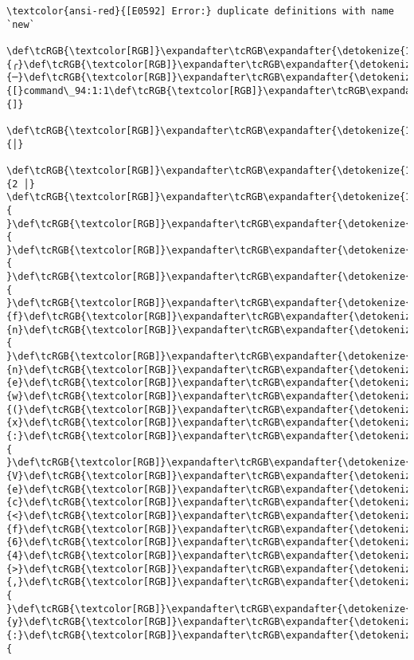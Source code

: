 \documentclass[11pt]{article}
\begin{document}
    \begin{Verbatim}[commandchars=\\\{\}, frame=single, framerule=2mm, rulecolor=\color{outerrorbackground}]
\textcolor{ansi-red}{[E0592] Error:} duplicate definitions with name `new`
   \def\tcRGB{\textcolor[RGB]}\expandafter\tcRGB\expandafter{\detokenize{148,148,148}}{╭}\def\tcRGB{\textcolor[RGB]}\expandafter\tcRGB\expandafter{\detokenize{148,148,148}}{─}\def\tcRGB{\textcolor[RGB]}\expandafter\tcRGB\expandafter{\detokenize{148,148,148}}{[}command\_94:1:1\def\tcRGB{\textcolor[RGB]}\expandafter\tcRGB\expandafter{\detokenize{148,148,148}}{]}
   \def\tcRGB{\textcolor[RGB]}\expandafter\tcRGB\expandafter{\detokenize{148,148,148}}{│}
 \def\tcRGB{\textcolor[RGB]}\expandafter\tcRGB\expandafter{\detokenize{148,148,148}}{2 │} \def\tcRGB{\textcolor[RGB]}\expandafter\tcRGB\expandafter{\detokenize{178,178,178}}{ }\def\tcRGB{\textcolor[RGB]}\expandafter\tcRGB\expandafter{\detokenize{178,178,178}}{ }\def\tcRGB{\textcolor[RGB]}\expandafter\tcRGB\expandafter{\detokenize{178,178,178}}{ }\def\tcRGB{\textcolor[RGB]}\expandafter\tcRGB\expandafter{\detokenize{178,178,178}}{ }\def\tcRGB{\textcolor[RGB]}\expandafter\tcRGB\expandafter{\detokenize{95,0,135}}{f}\def\tcRGB{\textcolor[RGB]}\expandafter\tcRGB\expandafter{\detokenize{95,0,135}}{n}\def\tcRGB{\textcolor[RGB]}\expandafter\tcRGB\expandafter{\detokenize{95,0,135}}{ }\def\tcRGB{\textcolor[RGB]}\expandafter\tcRGB\expandafter{\detokenize{95,0,135}}{n}\def\tcRGB{\textcolor[RGB]}\expandafter\tcRGB\expandafter{\detokenize{95,0,135}}{e}\def\tcRGB{\textcolor[RGB]}\expandafter\tcRGB\expandafter{\detokenize{95,0,135}}{w}\def\tcRGB{\textcolor[RGB]}\expandafter\tcRGB\expandafter{\detokenize{95,0,135}}{(}\def\tcRGB{\textcolor[RGB]}\expandafter\tcRGB\expandafter{\detokenize{95,0,135}}{x}\def\tcRGB{\textcolor[RGB]}\expandafter\tcRGB\expandafter{\detokenize{95,0,135}}{:}\def\tcRGB{\textcolor[RGB]}\expandafter\tcRGB\expandafter{\detokenize{95,0,135}}{ }\def\tcRGB{\textcolor[RGB]}\expandafter\tcRGB\expandafter{\detokenize{95,0,135}}{V}\def\tcRGB{\textcolor[RGB]}\expandafter\tcRGB\expandafter{\detokenize{95,0,135}}{e}\def\tcRGB{\textcolor[RGB]}\expandafter\tcRGB\expandafter{\detokenize{95,0,135}}{c}\def\tcRGB{\textcolor[RGB]}\expandafter\tcRGB\expandafter{\detokenize{95,0,135}}{<}\def\tcRGB{\textcolor[RGB]}\expandafter\tcRGB\expandafter{\detokenize{95,0,135}}{f}\def\tcRGB{\textcolor[RGB]}\expandafter\tcRGB\expandafter{\detokenize{95,0,135}}{6}\def\tcRGB{\textcolor[RGB]}\expandafter\tcRGB\expandafter{\detokenize{95,0,135}}{4}\def\tcRGB{\textcolor[RGB]}\expandafter\tcRGB\expandafter{\detokenize{95,0,135}}{>}\def\tcRGB{\textcolor[RGB]}\expandafter\tcRGB\expandafter{\detokenize{95,0,135}}{,}\def\tcRGB{\textcolor[RGB]}\expandafter\tcRGB\expandafter{\detokenize{95,0,135}}{ }\def\tcRGB{\textcolor[RGB]}\expandafter\tcRGB\expandafter{\detokenize{95,0,135}}{y}\def\tcRGB{\textcolor[RGB]}\expandafter\tcRGB\expandafter{\detokenize{95,0,135}}{:}\def\tcRGB{\textcolor[RGB]}\expandafter\tcRGB\expandafter{\detokenize{95,0,135}}{ 
\end{Verbatim}
\end{document}
